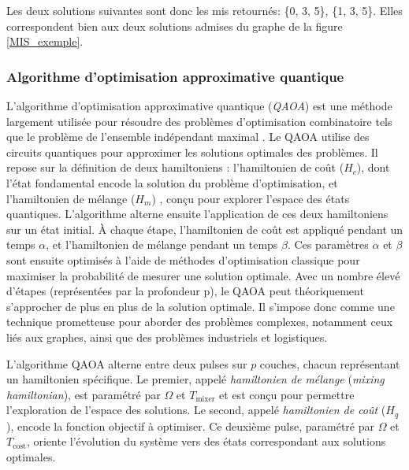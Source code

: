 \documentclass[11pt]{article}
\begin{document}
Les deux solutions suivantes sont donc les mis retournés: \{0, 3, 5\}, \{1, 3, 5\}. Elles correspondent bien aux deux solutions admises du graphe de la figure \ref{MIS_exemple}.



\subsubsection{Algorithme d'optimisation approximative quantique} 
 
 L'algorithme d'optimisation approximative quantique (\textit{QAOA}) est une méthode largement utilisée pour résoudre des problèmes d'optimisation combinatoire tels que le problème de l'ensemble indépendant maximal \cite{farhi_quantum_2014}. Le QAOA utilise des circuits quantiques pour approximer les solutions optimales des problèmes. Il repose sur la définition de deux hamiltoniens : l'hamiltonien de coût ($H_c$), dont l'état fondamental encode la solution du problème d’optimisation, et l'hamiltonien de mélange ($H_m$) , conçu pour explorer l'espace des états quantiques. 
 L'algorithme alterne ensuite l'application de ces deux hamiltoniens sur un état initial. À chaque étape, l'hamiltonien de coût est appliqué pendant un temps $\alpha$, et l'hamiltonien de mélange pendant un temps $\beta$.  Ces paramètres $\alpha$ et $\beta$ sont ensuite optimisés à l'aide de méthodes d'optimisation classique pour maximiser la probabilité de mesurer une solution optimale.
 Avec un nombre élevé d'étapes (représentées par la profondeur p), le QAOA peut théoriquement s'approcher de plus en plus de la solution optimale. Il s'impose donc comme une technique prometteuse pour aborder des problèmes complexes, notamment ceux liés aux graphes, ainsi que des problèmes industriels et logistiques.

 L'algorithme QAOA alterne entre deux pulses sur \( p \) couches, chacun représentant un hamiltonien spécifique. Le premier, appelé \textit{hamiltonien de mélange} (\textit{mixing hamiltonian}), est paramétré par \( \Omega \) et \( T_{\text{mixer}} \) et est conçu pour permettre l'exploration de l'espace des solutions. Le second, appelé \textit{hamiltonien de coût} (\( H_q \)), encode la fonction objectif à optimiser. Ce deuxième pulse, paramétré par \( \Omega \) et \( T_{\text{cost}} \), oriente l'évolution du système vers des états correspondant aux solutions optimales.
\end{document}

